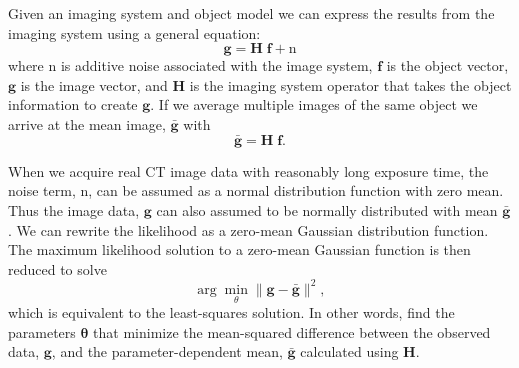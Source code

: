 Given an imaging system and object model we can express the results from the imaging system using a general equation:
\begin{equation}
\label{eq:gHf}
\mathbf{g} = \mathbf{H} \; \mathbf{f} + \mathrm{n}
\end{equation}
where $\mathrm{n}$ is additive noise associated with the image system, $\mathbf{f}$ is the object vector, $\mathbf{g}$ is the image vector, and $\mathbf{H}$ is the imaging system operator that takes the object information to create $\mathbf{g}$.  If we average multiple images of the same object we arrive at the mean image, $\mathbf{\bar{g}}$ with
\begin{equation}
\label{eq:gbar}
\mathbf{\bar{g}} = \mathbf{H} \; \mathbf{f}.
\end{equation}

When we acquire real CT image data with reasonably long exposure time, the noise term, $\mathrm{n}$, can be assumed as a normal distribution function with zero mean.  Thus the image data, $\mathbf{g}$ can also assumed to be normally distributed with mean $\mathbf{\bar{g}}$.  We can rewrite the likelihood as a zero-mean Gaussian distribution function.  The maximum likelihood solution to a zero-mean Gaussian function is then reduced to solve
\begin{equation}
\arg\min_{\theta} \| \mathbf{g} - \mathbf{\bar{g}} \|^2,
\label{eq:least_square}
\end{equation}
which is equivalent to the least-squares solution.  In other words, find the parameters $\boldsymbol{\theta}$ that minimize the mean-squared difference between the observed data, $\mathbf{g}$, and the parameter-dependent mean, $\mathbf{\bar{g}}$ calculated using $\mathbf{H}$.  

